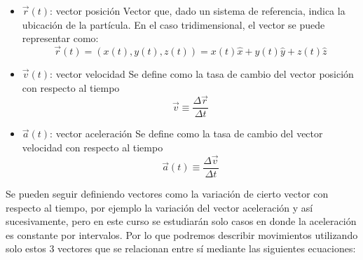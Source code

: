 \documentclass[letterpaper,11pt]{article}
\begin{document}
\vspace{1em}
\noindent
\begin{minipage}{0.65\textwidth}
    \begin{itemize}
        \item $\vec{r}(t)$: vector posición \newline        
        Vector que, dado un sistema de referencia, indica la ubicación de la partícula.\newline
        En el caso tridimensional, el vector se puede representar como:
        \[\vec{r}(t) = \left(x(t), y(t), z(t)\right) = x(t)\hat{x} + y(t)\hat{y} + z(t)\hat{z}\]

        \item $\vec{v}(t)$: vector velocidad \newline
        Se define como la tasa de cambio del vector posición con respecto al tiempo
        \[\vec{v} \equiv \frac{\Delta \vec{r}}{\Delta t}\]
    \end{itemize}
\end{minipage}
\hfill
\begin{minipage}{0.3\textwidth}
    \begin{figure}[H]
        \centering
        
    \end{figure}
\end{minipage}


\begin{itemize}
        \item $\vec{a}(t)$: vector aceleración \newline
        Se define como la tasa de cambio del vector velocidad con respecto al tiempo
        \[\vec{a}(t) \equiv \frac{\Delta \vec{v}}{\Delta t}\]
\end{itemize}

 \noindent Se pueden seguir definiendo vectores como la variación de cierto vector con respecto al tiempo, por ejemplo la variación del vector aceleración y así sucesivamente, pero en este curso se estudiarán solo casos en donde la aceleración es constante por intervalos. Por lo que podremos describir movimientos utilizando solo estos 3 vectores que se relacionan entre sí mediante las siguientes ecuaciones:
\end{document}
